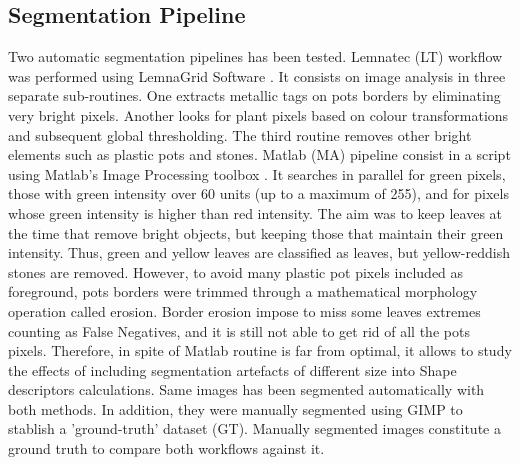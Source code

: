 \documentclass{frontiersSCNS} %
\begin{document}
\subsection{Segmentation Pipeline}

Two automatic segmentation pipelines has been tested. Lemnatec (LT) workflow was performed using LemnaGrid Software \cite{ISI:000245413900027}. It consists on image analysis in three separate sub-routines. One extracts metallic tags on pots borders by eliminating very bright pixels. Another looks for plant pixels based on colour transformations and subsequent global thresholding. The third routine removes other bright elements such as plastic pots and stones.
Matlab (MA) pipeline consist in a script using Matlab’s Image Processing toolbox \cite{MATLAB:2010}. It searches in parallel for green pixels, those with green intensity over 60 units (up to a maximum of 255), and for pixels whose green intensity is higher than red intensity. The aim was to keep leaves at the time that remove bright objects, but keeping those that maintain their green intensity. Thus, green and yellow leaves are classified as leaves, but yellow-reddish stones are removed. However, to avoid many plastic pot pixels included as foreground, pots borders were trimmed through a mathematical morphology operation called erosion. Border erosion impose to miss some leaves extremes counting as False Negatives, and it is still not able to get rid of all the pots pixels. Therefore, in spite of Matlab routine is far from optimal, it allows to study the effects of including segmentation artefacts of different size into Shape descriptors calculations.
Same  images has been segmented automatically with both methods. In addition, they were manually segmented using GIMP \cite{} to stablish a 'ground-truth' dataset (GT). Manually segmented images constitute a ground truth to compare both workflows against it.
\end{document}
